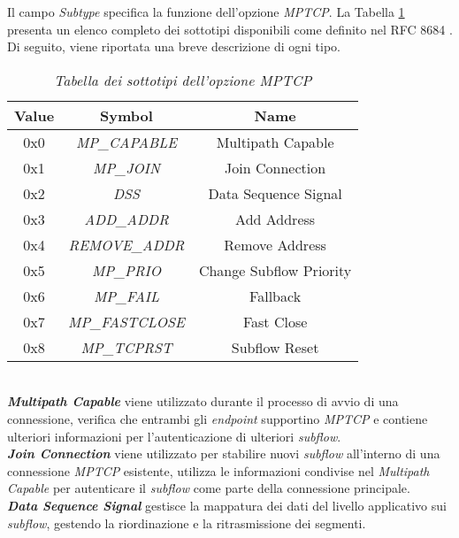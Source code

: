 \noindent Il campo \emph{Subtype} specifica la funzione dell'opzione \emph{MPTCP}. La Tabella \ref{options-subtypes} presenta un elenco completo dei sottotipi disponibili come definito nel RFC 8684 \cite{site:mptcp-packet}. Di seguito, viene riportata una breve descrizione di ogni tipo.

\begin{table}[!h]
    \centering
    \begin{tabular}{|c|c|c|}
        \hline
        \textbf{Value} & \textbf{Symbol} & \textbf{Name} \\
        \hline
        0x0 & \emph{MP\_CAPABLE} & Multipath Capable \\
        \hline
        0x1 & \emph{MP\_JOIN} & Join Connection \\
        \hline
        0x2 & \emph{DSS} & Data Sequence Signal \\
        \hline
        0x3 & \emph{ADD\_ADDR} & Add Address \\
        \hline
        0x4 & \emph{REMOVE\_ADDR} & Remove Address \\
        \hline
        0x5 & \emph{MP\_PRIO} & Change Subflow Priority \\
        \hline
        0x6 & \emph{MP\_FAIL} & Fallback \\
        \hline
        0x7 & \emph{MP\_FASTCLOSE} & Fast Close \\
        \hline
        0x8 & \emph{MP\_TCPRST} & Subflow Reset \\
        \hline
    \end{tabular}
    \caption{\emph{Tabella dei sottotipi dell'opzione MPTCP}}
    \label{options-subtypes}
\end{table}
~\\
\indent \textbf{\emph{Multipath Capable}} viene utilizzato durante il processo di avvio di una connessione, verifica che entrambi gli \emph{endpoint} supportino \emph{MPTCP} e contiene ulteriori informazioni per l'autenticazione di ulteriori \emph{subflow}.
\\
\indent \textbf{\emph{Join Connection}} viene utilizzato per stabilire nuovi \emph{subflow} all'interno di una connessione \emph{MPTCP} esistente, utilizza le informazioni condivise nel \emph{Multipath Capable} per autenticare il \emph{subflow} come parte della connessione principale.
\\
\indent \textbf{\emph{Data Sequence Signal}} gestisce la mappatura dei dati del livello applicativo sui \emph{subflow}, gestendo la riordinazione e la ritrasmissione dei segmenti. 
